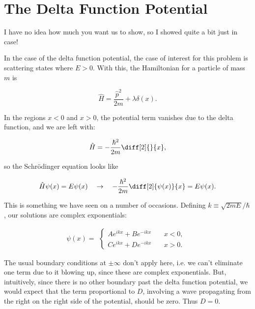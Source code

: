 \section{The Delta Function Potential}

I have no idea how much you want us to show, so I showed quite a bit just in case!

In the case of the delta function potential, the case of interest for this problem is scattering states where $E > 0$. With this, the Hamiltonian for a particle of mass $m$ is

\begin{equation}
  \hat{H} = \frac{\hat{p}^2}{2m} + \lambda\delta(x).
\end{equation}

In the regions $x < 0$ and $x > 0$, the potential term vanishes due to the delta function, and we are left with:

\begin{equation}
  \hat{H} = -\frac{\hbar^2}{2m} \diff[2]{}{x},
\end{equation}

so the Schr\"odinger equation looks like

\begin{equation}
  \hat{H}\psi(x) = E\psi(x) \quad\rightarrow\quad -\frac{\hbar^2}{2m} \diff[2]{\psi(x)}{x} = E\psi(x).
\end{equation}

This is something we have seen on a number of occasions. Defining $k \equiv \sqrt{2mE}/\hbar$, our solutions are complex exponentials:

\begin{equation}
  \psi(x) =
  \begin{alignedat}{2}
  \begin{cases}
    Ae^{ikx} + Be^{-ikx} \quad & x < 0, \\
    Ce^{ikx} + De^{-ikx} \quad & x > 0.
  \end{cases}
  \end{alignedat}
\end{equation}

The usual boundary conditions at $\pm\infty$ don't apply here, i.e. we can't eliminate one term due to it blowing up, since these are complex exponentials. But, intuitively, since there is no other boundary past the delta function potential, we would expect that the term proportional to $D$, involving a wave propagating from the right on the right side of the potential, should be zero. Thus $D = 0$.

